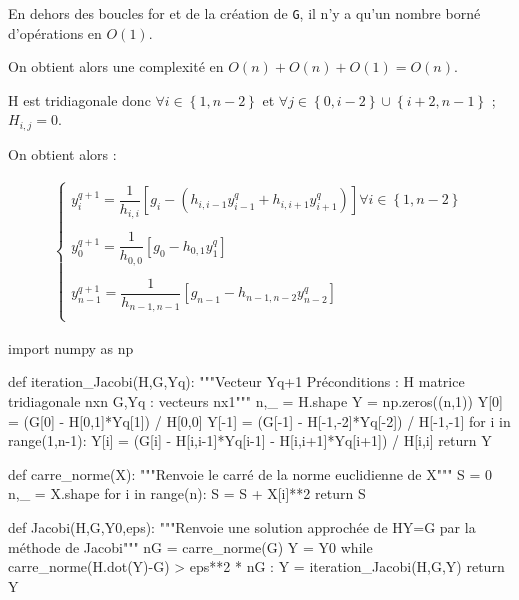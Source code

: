 En dehors des boucles for et de la création de \texttt G, il n'y a qu'un nombre borné d'opérations en $O(1)$.

On obtient alors une complexité en $O(n)+O(n)+O(1) = O(n)$.

\question{} 

H est tridiagonale donc $\forall i \in \left\{1,n-2\right\}$ et $\forall j \in \left\{0,i-2\right\}\cup \left\{i+2,n-1\right\}$ ; $H_{i,j}=0$.

On obtient alors : 

\begin{align*}
\left\{
\begin{array}{c}
y_i^{q+1}=\dfrac{1}{h_{i,i}}\left[g_i-\left(h_{i,i-1}y^q_{i-1}+h_{i,i+1}y^q_{i+1}\right)\right]\forall i\in\left\{1,n-2\right\}\\
\\
y_0^{q+1}=\dfrac{1}{h_{0,0}}\left[g_0 -h_{0,1}y^q_{1}\right]\\
\\
y_{n-1}^{q+1}=\dfrac{1}{h_{n-1,n-1}}\left[g_{n-1}-h_{n-1,n-2}y^q_{n-2}\right]\\
\end{array}
\right.
\end{align*}  

\question{}


\begin{pyverbatim}
import numpy as np

def iteration_Jacobi(H,G,Yq):
    """Vecteur Yq+1 
    Préconditions : H matrice tridiagonale nxn
                    G,Yq : vecteurs nx1"""
    n,_ = H.shape
    Y = np.zeros((n,1))
    Y[0] = (G[0] - H[0,1]*Yq[1]) / H[0,0]
    Y[-1] = (G[-1] - H[-1,-2]*Yq[-2]) / H[-1,-1]
    for i in range(1,n-1):
        Y[i] = (G[i] - H[i,i-1]*Yq[i-1] - H[i,i+1]*Yq[i+1]) / H[i,i]
    return Y
\end{pyverbatim}



\question{}

\begin{pyverbatim}
def carre_norme(X):
    """Renvoie le carré de la norme euclidienne de X"""
    S = 0
    n,_ = X.shape
    for i in range(n):
        S = S + X[i]**2
    return S
\end{pyverbatim}


\question{}

\begin{pyverbatim}
def Jacobi(H,G,Y0,eps):
    """Renvoie une solution approchée de HY=G par la méthode de Jacobi"""
    nG = carre_norme(G)
    Y = Y0
    while carre_norme(H.dot(Y)-G) > eps**2 * nG : 
        Y = iteration_Jacobi(H,G,Y)
    return Y
\end{pyverbatim}

